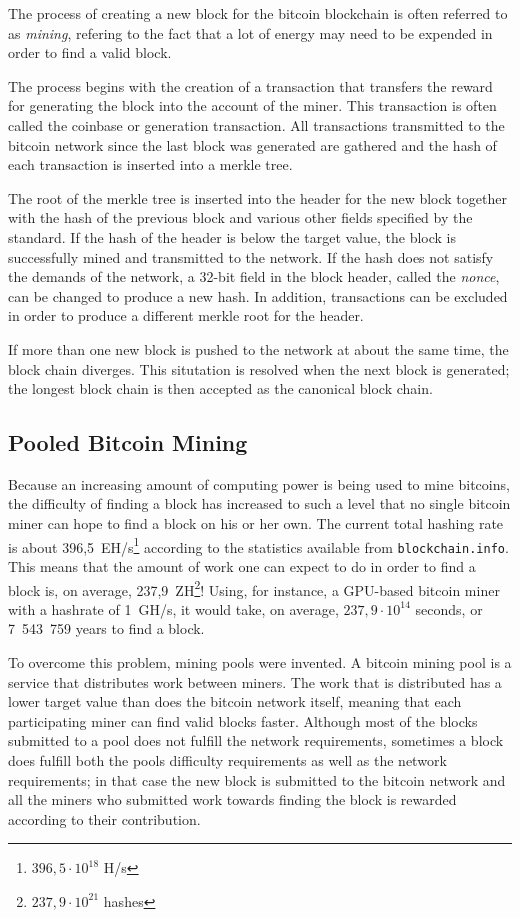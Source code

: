 The process of creating a new block for the bitcoin blockchain is often referred to as \textit{mining},
refering to the fact that a lot of energy may need to be expended in order to find a valid block.

The process begins with the creation of a transaction that transfers the reward for generating the block
into the account of the miner. This transaction is often called the coinbase or generation transaction.
All transactions transmitted to the bitcoin network since the last block was generated are gathered and
the hash of each transaction is inserted into a merkle tree.

The root of the merkle tree is inserted into the header for the new block together with the hash of the
previous block and various other fields specified by the standard. If the hash of the header is below the
target value, the block is successfully mined and transmitted to the network. If the hash does not satisfy
the demands of the network, a 32-bit field in the block header, called the \textit{nonce}, can be changed
to produce a new hash. In addition, transactions can be excluded in order to produce a different merkle
root for the header.

If more than one new block is pushed to the network at about the same time, the block chain diverges.
This situtation is resolved when the next block is generated; the longest block chain is then accepted
as the canonical block chain. \cite{bitcoin}

\subsection{Pooled Bitcoin Mining}

Because an increasing amount of computing power is being used to mine bitcoins, the difficulty of finding
a block has increased to such a level that no single bitcoin miner can hope to find a block on his or her
own. The current total hashing rate is about 396,5~EH/s\footnote{$396,5\cdot 10^{18}$ H/s} according to the
statistics available from \texttt{blockchain.info}. This means that the amount of work one can expect to
do in order to find a block is, on average, 237,9~ZH\footnote{$237,9\cdot 10^{21}$ hashes}! Using, for instance,
a GPU-based bitcoin miner with a hashrate of 1~GH/s, it would take, on average, $237,9\cdot 10^{14}$ seconds,
or 7~543~759 years to find a block.

To overcome this problem, mining pools were invented. A bitcoin mining pool is a service that distributes
work between miners. The work that is distributed has a lower target value than does the bitcoin network
itself, meaning that each participating miner can find valid blocks faster. Although most of the blocks
submitted to a pool does not fulfill the network requirements, sometimes a block does fulfill both the
pools difficulty requirements as well as the network requirements; in that case the new block is
submitted to the bitcoin network and all the miners who submitted work towards finding the block
is rewarded according to their contribution.


